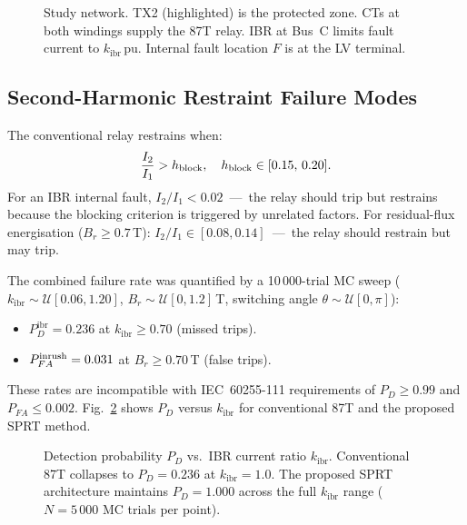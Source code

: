 \documentclass[journal,twoside,10pt]{IEEEtran}
\newcommand{\kibr}{k_{\mathrm{ibr}}}
\newcommand{\Pdibr}{P_D^{\mathrm{ibr}}}
\begin{document}
\begin{figure}[!t]
  \centering
  
  \caption{Study network. TX2 (highlighted) is the protected zone.
           CTs at both windings supply the 87T relay.
           IBR at Bus~C limits fault current to $\kibr$\,pu.
           Internal fault location $F$ is at the LV terminal.}
  \label{fig:system}
\end{figure}

\subsection{Second-Harmonic Restraint Failure Modes}
\label{sec:2h_failure}

The conventional relay restrains when:
\begin{equation}
  \frac{I_2}{I_1} > h_{\rm block}, \quad h_{\rm block} \in [0.15,\,0.20].
  \label{eq:2h_restrain}
\end{equation}
For an IBR internal fault, $I_2/I_1 < 0.02$~---~the relay should trip
but restrains because the blocking criterion is triggered by unrelated
factors.
For residual-flux energisation ($B_r \geq 0.7\,$T):
$I_2/I_1 \in [0.08, 0.14]$~---~the relay should restrain but may trip.

The combined failure rate was quantified by a 10\,000-trial MC sweep
($\kibr \sim \mathcal{U}[0.06, 1.20]$, $B_r \sim \mathcal{U}[0, 1.2]\,$T,
switching angle $\theta \sim \mathcal{U}[0, \pi]$):
\begin{itemize}
  \item $\Pdibr = 0.236$ at $\kibr \geq 0.70$ (missed trips).
  \item $P_{FA}^{\rm inrush} = 0.031$ at $B_r \geq 0.70\,$T (false trips).
\end{itemize}
These rates are incompatible with IEC~60255-111 requirements of
$P_D \geq 0.99$ and $P_{FA} \leq 0.002$.
Fig.~\ref{fig:pd_compare} shows $P_D$ versus $\kibr$ for conventional 87T
and the proposed SPRT method.

\begin{figure}[!t]
  \centering
  
  \caption{Detection probability $P_D$ vs.\ IBR current ratio $\kibr$.
           Conventional 87T collapses to $P_D = 0.236$ at $\kibr = 1.0$.
           The proposed SPRT architecture maintains $P_D = 1.000$ across
           the full $\kibr$ range ($N = 5\,000$ MC trials per point).}
  \label{fig:pd_compare}
\end{figure}

\end{document}
